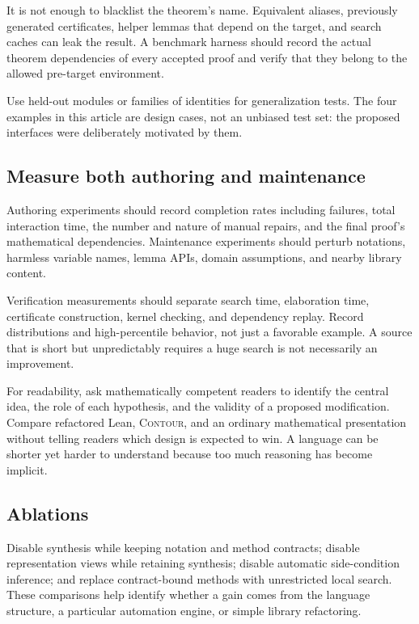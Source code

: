 \documentclass[11pt,a4paper]{article}
\newcommand{\contour}{\textsc{Contour}}
\begin{document}
It is not enough to blacklist the theorem's name. Equivalent aliases, previously generated certificates, helper lemmas that depend on the target, and search caches can leak the result. A benchmark harness should record the actual theorem dependencies of every accepted proof and verify that they belong to the allowed pre-target environment.

Use held-out modules or families of identities for generalization tests. The four examples in this article are design cases, not an unbiased test set: the proposed interfaces were deliberately motivated by them.

\subsection{Measure both authoring and maintenance}

Authoring experiments should record completion rates including failures, total interaction time, the number and nature of manual repairs, and the final proof's mathematical dependencies. Maintenance experiments should perturb notations, harmless variable names, lemma APIs, domain assumptions, and nearby library content.

Verification measurements should separate search time, elaboration time, certificate construction, kernel checking, and dependency replay. Record distributions and high-percentile behavior, not just a favorable example. A source that is short but unpredictably requires a huge search is not necessarily an improvement.

For readability, ask mathematically competent readers to identify the central idea, the role of each hypothesis, and the validity of a proposed modification. Compare refactored Lean, \contour{}, and an ordinary mathematical presentation without telling readers which design is expected to win. A language can be shorter yet harder to understand because too much reasoning has become implicit.

\subsection{Ablations}

Disable synthesis while keeping notation and method contracts; disable representation views while retaining synthesis; disable automatic side-condition inference; and replace contract-bound methods with unrestricted local search. These comparisons help identify whether a gain comes from the language structure, a particular automation engine, or simple library refactoring.
\end{document}
